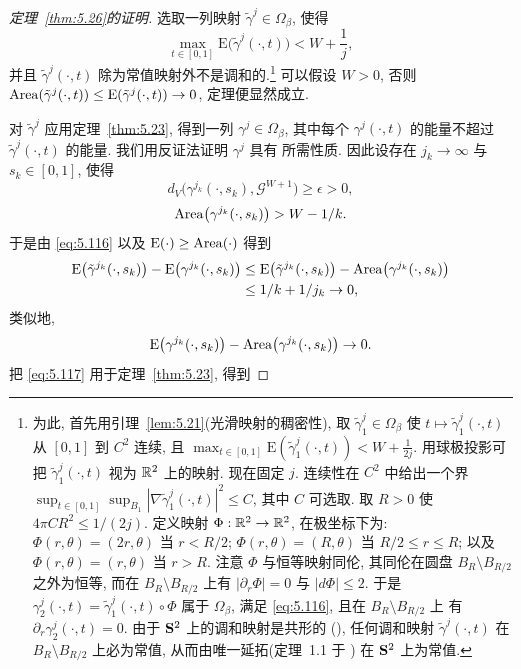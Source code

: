 \begin{proof}[定理~\ref{thm:5.26}的证明]
选取一列映射 $\tilde{\gamma}^j\in\Omega_\beta$, 使得
\begin{equation}
\max_{t\in[0,1]}\mathrm{E}\bigl(\tilde{\gamma}^j(\cdot,t)\bigr)
<W+\frac1j,
\label{eq:5.116}
\end{equation}
并且 $\tilde{\gamma}^j(\cdot,t)$ 除为常值映射外不是调和的.\footnote{为此,
首先用引理~\ref{lem:5.21}(光滑映射的稠密性), 取
$\tilde{\gamma}_1^j\in\Omega_\beta$ 使
$t\mapsto\tilde{\gamma}_1^j(\cdot,t)$ 从 $[0,1]$ 到 $C^2$ 连续, 且
$\max_{t\in[0,1]}\mathrm{E}(\tilde{\gamma}_1^j(\cdot,t))
<W+\frac1{2j}$. 用球极投影可把 $\tilde{\gamma}_1^j(\cdot,t)$ 视为
$\mathbb{R}^2$ 上的映射. 现在固定 $j$. 连续性在 $C^2$ 中给出一个界
$\sup_{t\in[0,1]}\sup_{B_1}|\nabla\tilde{\gamma}_1^j(\cdot,t)|^2\leq C$,
其中 $C$ 可选取. 取 $R>0$ 使 $4\pi CR^2\leq 1/(2j)$. 定义映射
$\Phi:\mathbb{R}^2\to\mathbb{R}^2$, 在极坐标下为: $\Phi(r,\theta)=(2r,\theta)$ 当
$r<R/2$; $\Phi(r,\theta)=(R,\theta)$ 当 $R/2\leq r\leq R$; 以及
$\Phi(r,\theta)=(r,\theta)$ 当 $r>R$. 注意 $\Phi$ 与恒等映射同伦,
其同伦在圆盘 $B_R\setminus B_{R/2}$ 之外为恒等, 而在
$B_R\setminus B_{R/2}$ 上有 $|\partial_r\Phi|=0$ 与 $|d\Phi|\leq 2$.
于是 $\gamma_2^j(\cdot,t)=\tilde{\gamma}_1^j(\cdot,t)\circ\Phi$ 属于
$\Omega_\beta$, 满足 \eqref{eq:5.116}, 且在 $B_R\setminus B_{R/2}$ 上
有 $\partial_r\gamma_2^j(\cdot,t)=0$. 由于 $\mathbf{S}^2$ 上的调和映射是共形的
(), 任何调和映射 $\tilde{\gamma}^j(\cdot,t)$ 在
$B_R\setminus B_{R/2}$ 上必为常值, 从而由唯一延拓(定理~1.1 于 \cite{Sj})
在 $\mathbf{S}^2$ 上为常值.} 可以假设 $W>0$, 否则
$\operatorname{Area}(\tilde{\gamma}^j(\cdot,t))\leq\mathrm{E}(\tilde{\gamma}^j(\cdot,t))
\to 0$, 定理便显然成立.

对 $\tilde{\gamma}^j$ 应用定理~\ref{thm:5.23}, 得到一列
$\gamma^j\in\Omega_\beta$, 其中每个 $\gamma^j(\cdot,t)$ 的能量不超过
$\tilde{\gamma}^j(\cdot,t)$ 的能量. 我们用反证法证明 $\gamma^j$ 具有
所需性质. 因此设存在 $j_k\to\infty$ 与 $s_k\in[0,1]$, 使得
\begin{equation*}
d_V\bigl(\gamma^{j_k}(\cdot,s_k),\mathcal{G}^{W+1}\bigr)\geq\epsilon>0,
\end{equation*}
\begin{equation*}
\operatorname{Area}\bigl(\gamma^{j_k}(\cdot,s_k)\bigr)>W-1/k.
\end{equation*}
于是由 \eqref{eq:5.116} 以及 $\mathrm{E}(\cdot)\geq\operatorname{Area}(\cdot)$ 得到
\begin{equation}
\begin{aligned}
\mathrm{E}\bigl(\tilde{\gamma}^{j_k}(\cdot,s_k)\bigr)
-\mathrm{E}\bigl(\gamma^{j_k}(\cdot,s_k)\bigr)
&\leq\mathrm{E}\bigl(\tilde{\gamma}^{j_k}(\cdot,s_k)\bigr)
-\operatorname{Area}\bigl(\gamma^{j_k}(\cdot,s_k)\bigr)\\
&\leq 1/k+1/j_k\to 0,
\end{aligned}
\label{eq:5.117}
\end{equation}
类似地,
\begin{equation*}
\mathrm{E}\bigl(\gamma^{j_k}(\cdot,s_k)\bigr)
-\operatorname{Area}\bigl(\gamma^{j_k}(\cdot,s_k)\bigr)\to 0.
\end{equation*}
把 \eqref{eq:5.117} 用于定理~\ref{thm:5.23}, 得到


\end{proof}
